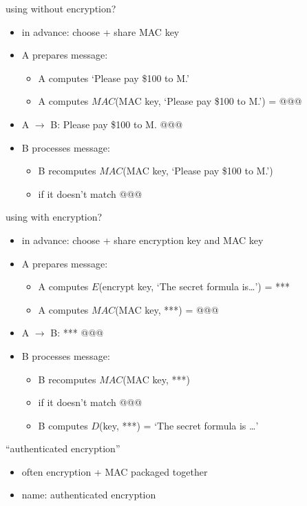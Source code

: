 \begin{frame}{using without encryption?}
    \begin{itemize}
    \item in advance: choose + share MAC key
    \vspace{.5cm}
    \item A prepares message:
    \begin{itemize}
    \item A computes `Please pay \$100 to M.'
    \item A computes $MAC$(MAC key, `Please pay \$100 to M.') = @@@
    \end{itemize}
    \item A $\rightarrow$ B: Please pay \$100 to M. @@@
    \item<2-> B processes message:
    \begin{itemize}
        \item B recomputes $MAC$(MAC key, `Please pay \$100 to M.')
        \item {} if it doesn't match @@@
    \end{itemize}
    \end{itemize}
\end{frame}

\begin{frame}{using with encryption?}
    \begin{itemize}
    \item in advance: choose + share encryption key and MAC key
    \vspace{.5cm}
    \item A prepares message:
    \begin{itemize}
    \item A computes $E$(encrypt key, `The secret formula is\ldots') = ***
    \item A computes $MAC$(MAC key, ***) = @@@
    \end{itemize}
    \item A $\rightarrow$ B: *** @@@
    \item<2-> B processes message:
    \begin{itemize}
        \item B recomputes $MAC$(MAC key, ***)
        \item {} if it doesn't match @@@
        \item B computes $D$(key, ***) = `The secret formula is \ldots'
    \end{itemize}
    \end{itemize}
\end{frame}

\begin{frame}{``authenticated encryption''}
    \begin{itemize}
    \item often encryption + MAC packaged together 
    \item name: authenticated encryption
    \end{itemize}
\end{frame}
